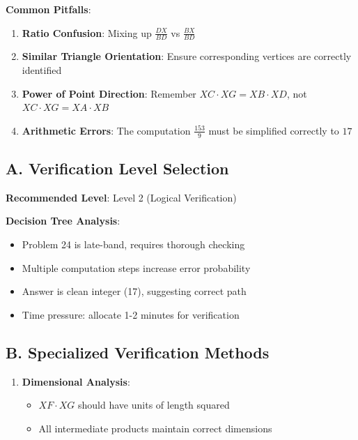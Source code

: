 \documentclass[]{article}
\begin{document}
\begin{warningbox}
\textbf{Common Pitfalls}:
\begin{enumerate}
    \item \textbf{Ratio Confusion}: Mixing up $\frac{DX}{BD}$ vs $\frac{BX}{BD}$
    \item \textbf{Similar Triangle Orientation}: Ensure corresponding vertices are correctly identified
    \item \textbf{Power of Point Direction}: Remember $XC \cdot XG = XB \cdot XD$, not $XC \cdot XG = XA \cdot XB$
    \item \textbf{Arithmetic Errors}: The computation $\frac{153}{9}$ must be simplified correctly to $17$
\end{enumerate}
\end{warningbox}

\begin{verificationbox}
\subsection*{A. Verification Level Selection}

\textbf{Recommended Level}: Level 2 (Logical Verification)

\textbf{Decision Tree Analysis}:
\begin{itemize}[leftmargin=*]
    \item Problem 24 is late-band, requires thorough checking
    \item Multiple computation steps increase error probability
    \item Answer is clean integer (17), suggesting correct path
    \item Time pressure: allocate 1-2 minutes for verification
\end{itemize}

\subsection*{B. Specialized Verification Methods}
\begin{enumerate}[leftmargin=*]
    \item \textbf{Dimensional Analysis}:
    \begin{itemize}
        \item $XF \cdot XG$ should have units of length squared
        \item All intermediate products maintain correct dimensions
    \end{itemize}
    

\end{enumerate}
\end{verificationbox}
\end{document}
